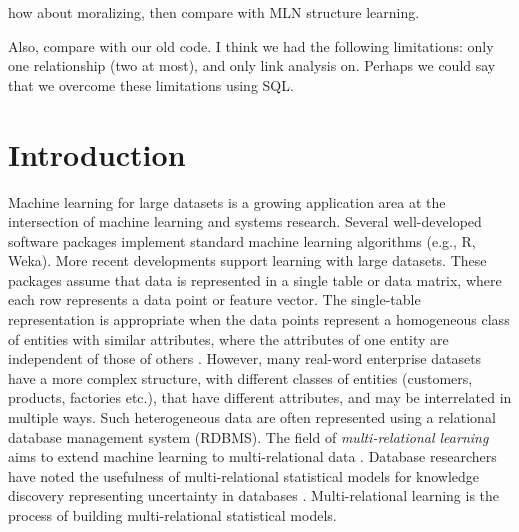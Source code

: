 \documentclass{acm_proc_article-sp}
\begin{document}
how about moralizing, then compare with MLN structure learning.

Also, compare with our old code. I think we had the following limitations: only one relationship (two at most), and only link analysis on. Perhaps we could say that we overcome these limitations using SQL.

\section{Introduction} Machine learning for large datasets is a growing application area at the intersection of machine learning and systems research. Several well-developed software packages implement standard machine learning algorithms (e.g., R, Weka). More recent developments support learning with large datasets. 
These packages assume that data is represented in a single table or data matrix, where each row represents a data point or feature vector. The single-table representation is appropriate when the data points represent a homogeneous class of entities with similar attributes, where the attributes of one entity are independent of those of others \cite{Bishop2006}. However, many real-word enterprise datasets have a more complex structure, with different classes of entities (customers, products, factories etc.), that have different attributes, and may be interrelated in multiple ways. Such heterogeneous data are often represented using a relational database management system (RDBMS). The field of {\em multi-relational learning} aims to extend machine learning to multi-relational data \cite{SRL2007,Domingos2009,Dzeroski2001c}. Database researchers have noted the usefulness of multi-relational statistical models for knowledge discovery representing uncertainty in databases \cite{Deshpande2007,Graepel_CIKM13,Wang2008}. Multi-relational learning is the process of building multi-relational statistical models.
\end{document}
